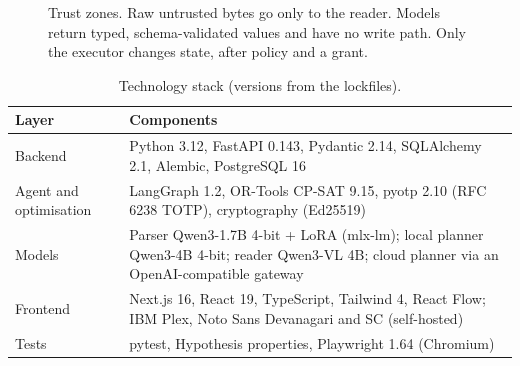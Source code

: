 \documentclass[11pt,a4paper]{article}
\begin{document}
\begin{figure}[!tb]
{}
\caption{Trust zones. Raw untrusted bytes go only to the reader. Models return typed, schema-validated values and have no write path. Only the executor changes state, after policy and a grant.}\label{fig:zones}
\end{figure}

\begin{table}[!tb]
\centering\footnotesize
\caption{Technology stack (versions from the lockfiles).}
\begin{tabularx}{\textwidth}{@{}l>{\raggedright\arraybackslash}X@{}}
\toprule
Layer & Components\\
\midrule
Backend & Python 3.12, FastAPI 0.143, Pydantic 2.14, SQLAlchemy 2.1, Alembic, PostgreSQL 16\\
Agent and optimisation & LangGraph 1.2, OR-Tools CP-SAT 9.15, pyotp 2.10 (RFC 6238 TOTP), cryptography (Ed25519)\\
Models & Parser Qwen3-1.7B 4-bit + LoRA (mlx-lm); local planner Qwen3-4B 4-bit; reader Qwen3-VL 4B; cloud planner via an OpenAI-compatible gateway\\
Frontend & Next.js 16, React 19, TypeScript, Tailwind 4, React Flow; IBM Plex, Noto Sans Devanagari and SC (self-hosted)\\
Tests & pytest, Hypothesis properties, Playwright 1.64 (Chromium)\\
\bottomrule
\end{tabularx}
\end{table}
\end{document}
